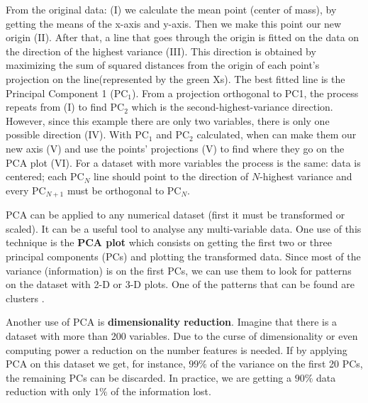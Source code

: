 From the original data: (I) we calculate the mean point (center of mass), by getting the means of the x-axis and y-axis. Then we make this point our new origin (II). After that, a line that goes through the origin is fitted on the data on the direction of the highest variance (III). This direction is obtained by maximizing the sum of squared distances from the origin of each point's projection on the line(represented by the green Xs). The best fitted line is the Principal Component 1 (PC$_{1}$). From a projection orthogonal to PC1, the process repeats from (I) to find PC$_{2}$ which is the second-highest-variance direction. However, since this example there are only two variables, there is only one possible direction (IV). With PC$_{1}$ and PC$_{2}$ calculated, when can make them our new axis (V) and use the points' projections (V) to find where they go on the PCA plot (VI). For a dataset with more variables the process is the same: data is centered; each PC$_{N}$ line should point to the direction of $N$-highest variance and every PC$_{N+1}$ must be orthogonal to PC$_{N}$.

PCA can be applied to any numerical dataset \cite{wold1987principal} (first it must be transformed or scaled). It can be a useful tool to analyse any multi-variable data. One use of this technique is the \textbf{PCA plot} which consists on getting the first two or three principal components (PCs) and plotting the transformed data. Since most of the variance (information) is on the first PCs, we can use them to look for patterns on the dataset with 2-D or 3-D plots. One of the patterns that can be found are clusters \cite{ding2004k}. 

Another use of PCA is \textbf{dimensionality reduction}. Imagine that there is a dataset with more than 200 variables. Due to the curse of dimensionality \cite{Bellman:2010:DP:1893145} or even computing power a reduction on the number features is needed. If by applying PCA on this dataset we get, for instance, $99\%$ of the variance on the first 20 PCs, the remaining PCs can be discarded. In practice, we are getting a $90\%$ data reduction with only $1\%$ of the information lost.





